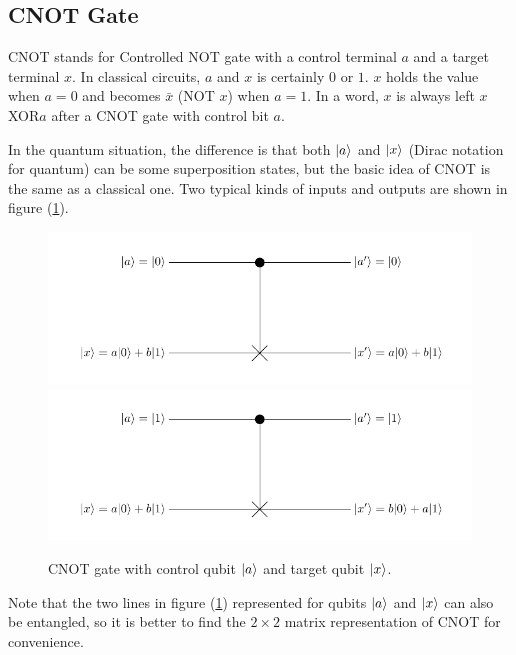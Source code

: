 	\subsection{CNOT Gate}
		CNOT stands for Controlled NOT gate with a control terminal $a$ and a target terminal $x$. 
		In classical circuits, $a$ and $x$ is certainly $0$ or $1$. $x$ holds the value when $a=0$ and becomes $\bar{x}$ (NOT $x$) when $a=1$. In a word, $x$ is always left $x$XOR$a$ after a CNOT gate with control bit $a$.

		In the quantum situation, the difference is that both $|{a} \rangle$ and $|{x} \rangle$ 
		(Dirac notation for quantum) can be some superposition states, but the 
		basic idea of CNOT is the same as a classical one.
		Two typical kinds of inputs and outputs are shown in figure (\ref{img:CNOT}).
		\begin{figure}  
		\centering
		\includegraphics[scale=0.7]{img/CNOT-1.pdf}
		\includegraphics[scale=0.7]{img/CNOT-2.pdf}
		\caption{CNOT gate with control qubit $|{a} \rangle$ and target qubit $|{x} \rangle$.}
		\label{img:CNOT}
		\end{figure}
		Note that the two lines in figure (\ref{img:CNOT}) represented for 
		qubits $|{a} \rangle$ and $|{x} \rangle$ can also be entangled, so it is better to find the $2\times 2$ matrix representation of CNOT for convenience.

